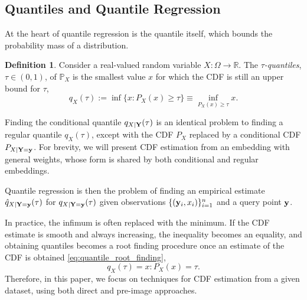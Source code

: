 \documentclass[twoside]{article} \usepackage{aistats2017}
\theoremstyle{definition}
\newtheorem{definition}{Definition}[section]
\theoremstyle{theorem}
\newcommand{\rv}[1]{{#1}}
\begin{document}
	\subsection{Quantiles and Quantile Regression}
	\label{sec:background:quantiles}

		At the heart of quantile regression is the quantile itself, which bounds the probability mass of a distribution.
		\begin{definition} \label{def:quantile}
			\citep{takeuchi2006nonparametric}
			Consider a real-valued random variable $\rv{X} : \Omega \to \mathbb{R}$. The \textit{$\tau$-quantiles}, $\tau \in (0, 1)$, of $\mathbb{P}_{\rv{X}}$ is the smallest value $x$ for which the CDF is still an upper bound for $\tau$,
			\begin{equation}
				q_{\rv{X}}(\tau) := \inf\{x : P_{\rv{X}}(x) \geq \tau\} \equiv \inf_{P_{\rv{X}}(x) \geq \tau} x.
			\label{eq:quantile}
			\end{equation}
		\end{definition}
		Finding the conditional quantile $q_{\rv{X} | \bvec{\rv{Y}}}(\tau)$ is an identical problem to finding a regular quantile $q_{\rv{X}}(\tau)$, except with the CDF $P_{\rv{X}}$ replaced by a conditional CDF $P_{\rv{X} | \bvec{\rv{Y}} = \bvec{y}}$. For brevity, we will present CDF estimation from an embedding with general weights, whose form is shared by both conditional and regular embeddings.

		Quantile regression is then the problem of finding an empirical estimate $\hat{q}_{\rv{X} | \bvec{\rv{Y}} = \bvec{y}}(\tau)$ for $q_{\rv{X} | \bvec{\rv{Y}} = \bvec{y}}(\tau)$ given observations $\{(\mathbf{y}_{i}, x_{i})\}_{i = 1}^{n}$ and a query point $\mathbf{y}$.
		
		In practice, the infimum is often replaced with the minimum. If the CDF estimate is smooth and always increasing, the inequality becomes an equality, and obtaining quantiles becomes a root finding procedure once an estimate of the CDF is obtained \eqref{eq:quantile_root_finding},
		\begin{equation}
			q_{\rv{X}}(\tau) = x : P_{\rv{X}}(x) = \tau.
		\label{eq:quantile_root_finding}
		\end{equation}	
		Therefore, in this paper, we focus on techniques for CDF estimation from a given dataset, using both direct and pre-image approaches.
	
\end{document}
